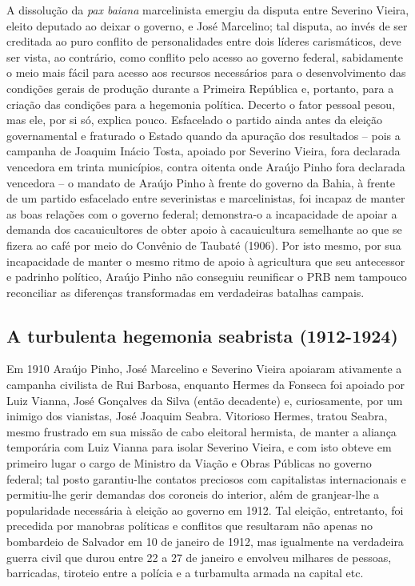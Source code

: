 A dissolução da \textit{pax baiana} marcelinista emergiu da disputa entre Severino Vieira, eleito deputado ao deixar o governo, e José Marcelino; tal disputa, ao invés de ser creditada ao puro conflito de personalidades entre dois líderes carismáticos, deve ser vista, ao contrário, como conflito pelo acesso ao governo federal, sabidamente o meio mais fácil para acesso aos recursos necessários para o desenvolvimento das condições gerais de produção durante a Primeira República e, portanto, para a criação das condições para a hegemonia política. Decerto o fator pessoal pesou, mas ele, por si só, explica pouco. Esfacelado o partido ainda antes da eleição governamental e fraturado o Estado quando da apuração dos resultados -- pois a campanha de Joaquim Inácio Tosta, apoiado por Severino Vieira, fora declarada vencedora em trinta municípios, contra oitenta onde Araújo Pinho fora declarada vencedora -- o mandato de Araújo Pinho à frente do governo da Bahia, à frente de um partido esfacelado entre severinistas e marcelinistas, foi incapaz de manter as boas relações com o governo federal; demonstra-o a incapacidade de apoiar a demanda dos cacauicultores de obter apoio à cacauicultura semelhante ao que se fizera ao café por meio do Convênio de Taubaté (1906). Por isto mesmo, por sua incapacidade de manter o mesmo ritmo de apoio à agricultura que seu antecessor e padrinho político, Araújo Pinho não conseguiu reunificar o PRB nem tampouco reconciliar as diferenças transformadas em verdadeiras batalhas campais.

\subsection{A turbulenta hegemonia seabrista (1912-1924)}

Em 1910 Araújo Pinho, José Marcelino e Severino Vieira apoiaram ativamente a campanha civilista de Rui Barbosa, enquanto Hermes da Fonseca foi apoiado por Luiz Vianna, José Gonçalves da Silva (então decadente) e, curiosamente, por um inimigo dos vianistas, José Joaquim Seabra. Vitorioso Hermes, tratou Seabra, mesmo frustrado em sua missão de cabo eleitoral hermista, de manter a aliança temporária com Luiz Vianna para isolar Severino Vieira, e com isto obteve em primeiro lugar o cargo de Ministro da Viação e Obras Públicas no governo federal; tal posto garantiu-lhe contatos preciosos com capitalistas internacionais e permitiu-lhe gerir demandas dos coroneis do interior, além de granjear-lhe a popularidade necessária à eleição ao governo em 1912. Tal eleição, entretanto, foi precedida por manobras políticas e conflitos que resultaram não apenas no bombardeio de Salvador em 10 de janeiro de 1912, mas igualmente na verdadeira guerra civil que durou entre 22 a 27 de janeiro e envolveu milhares de pessoas, barricadas, tiroteio entre a polícia e a turbamulta armada na capital etc. 

